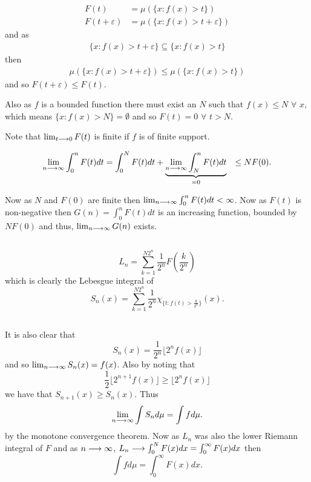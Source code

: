 \documentclass{unswmaths}
\begin{document}
\subsection{}
\begin{align*}
    F(t) &= \mu\left( \{ x : f(x) > t \} \right) \\
    F(t+\varepsilon) &= \mu\left( \{ x : f(x) > t + \varepsilon \} \right)
\end{align*}
and as
\begin{align*}
    \{ x : f(x) > t + \varepsilon \} \subseteq \{ x : f(x) > t \}
\end{align*}
then
\begin{align*}
  \mu\left( \{ x : f(x) > t + \varepsilon \} \right) \leq \mu\left( \{ x : f(x) > t \} \right)
\end{align*}
and so $ F(t+\varepsilon) \leq F(t) $.

Also as $ f $ is a bounded function there must exist an $ N $ such that $ f(x) \leq N $ $ \forall $ $ x $, which means
$ \{ x : f(x) > N  \} = \emptyset $ and so $ F(t) = 0 $ $ \forall $ $ t > N $.

Note that $ \lim_{t \longrightarrow 0} F(t) $ is finite if $ f $ is of finite support.

\begin{align*}
    \lim_{n \longrightarrow \infty} \int_0^n F(t)dt &= \int_0^N F(t) dt + \underbrace{\lim_{n \longrightarrow \infty} \int_N^n F(t) dt}_{=0} 
	&\leq N F(0).
\end{align*}

Now as $ N $ and $ F(0) $ are finite then $ \lim_{n \longrightarrow \infty} \int_0^n F(t)dt < \infty $. 
Now as $ F(t) $ is non-negative then $ G(n) = \int_0^n F(t) dt $ is an increasing function, bounded by $ NF(0) $ and thus,
$ \lim_{n \longrightarrow \infty} G(n) $ exists.

\subsection{}
$$
    L_n = \sum_{k = 1}^{N2^n} \frac{1}{2^n} F(\frac{k}{2^n})
$$
which is clearly the Lebesgue integral of
$$
    S_n(x) = \sum_{k=1}^{N2^n} \frac{1}{2^n} \chi_{\{ t : f(t) > \frac{k}{2^n} \}}(x).
$$
\subsection{}
It is also clear that
$$
    S_n(x) = \frac{1}{2^n} \lfloor 2^nf(x) \rfloor
$$
and so $ \lim_{n \longrightarrow \infty} S_n(x) = f(x) $. Also by noting that 
$$
    \frac{1}{2} \lfloor 2^{n+1} f(x) \rfloor \geq \lfloor 2^n f(x) \rfloor 
$$
we have that $ S_{n+1}(x) \geq S_n(x) $.
Thus 
$$
    \lim_{n \longrightarrow \infty} \int S_n d\mu = \int f d\mu.
$$
by the monotone convergence theorem.
Now as $L_n$ was also the lower Riemann integral of $F$ and as $ n \longrightarrow \infty $, $ L_n \longrightarrow \int_0^N F(x) dx = \int_0^\infty F(x) dx $ then 
$$
    \int f d\mu = \int_0^\infty F(x) dx.
$$
\end{document}
